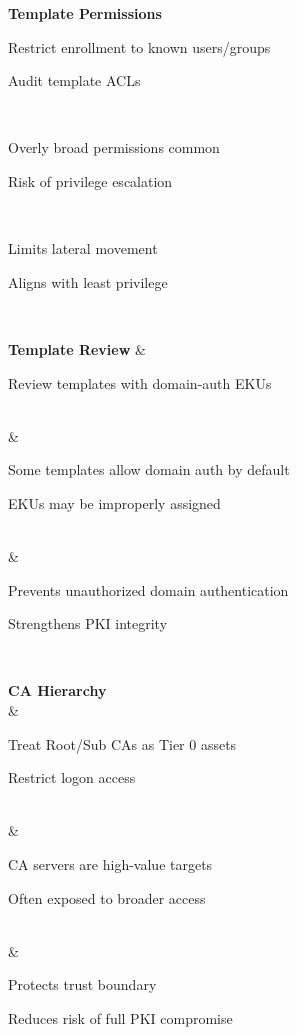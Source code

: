{\textbf{Template Permissions} \\
\begin{tightitemize}
    \item Restrict enrollment to known users/groups
    \item Audit template ACLs
\end{tightitemize} \\ 
\begin{tightitemize}
    \item Overly broad permissions common
    \item Risk of privilege escalation
\end{tightitemize} \\
\begin{tightitemize}
    \item Limits lateral movement
    \item Aligns with least privilege
\end{tightitemize} \\
\hline

\textbf{Template Review} & 
\begin{tightitemize}
    \item Review templates with domain-auth EKUs
\end{tightitemize} \\\& 
\begin{tightitemize}
    \item Some templates allow domain auth by default
    \item EKUs may be improperly assigned
\end{tightitemize} \\\& 
\begin{tightitemize}
    \item Prevents unauthorized domain authentication
    \item Strengthens PKI integrity
\end{tightitemize} \\
\hline

\textbf{CA Hierarchy} \\\& 
\begin{tightitemize}
    \item Treat Root/Sub CAs as Tier 0 assets
    \item Restrict logon access
\end{tightitemize} \\\& 
\begin{tightitemize}
    \item CA servers are high-value targets
    \item Often exposed to broader access
\end{tightitemize} \\\& 
\begin{tightitemize}
    \item Protects trust boundary
    \item Reduces risk of full PKI compromise
\end{tightitemize} \\
\hline

}
